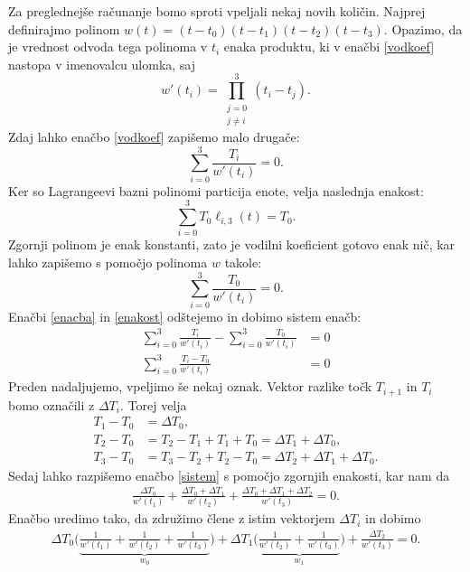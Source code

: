 \documentclass[mat1]{fmfdelo}
\newcommand{\de}{\Delta}
\begin{document}
Za preglednejše računanje bomo sproti vpeljali nekaj novih količin. Najprej definirajmo polinom $w(t) = (t - t_0)(t - t_1)(t - t_2)(t - t_3)$. Opazimo, da je vrednost odvoda tega polinoma v $t_i$ enaka produktu, ki v enačbi \eqref{vodkoef} nastopa v imenovalcu ulomka, saj
%
\begin{equation*}
w'(t_i) = \prod_{\substack{j = 0 \\ j \neq i}}^3(t_i - t_j).
\end{equation*}
%
Zdaj lahko enačbo \eqref{vodkoef} zapišemo malo drugače:
\begin{equation}\label{enacba}
\sum_{i = 0}^{3}  \frac{T_i}{w'(t_i)} = 0.
\end{equation}
%
Ker so Lagrangeevi bazni polinomi particija enote, velja naslednja enakost:
\begin{equation*}
\sum_{i = 0}^{3} T_0 \ell_{i,3}(t)  = T_0.
\end{equation*}
%
Zgornji polinom je enak konstanti, zato je vodilni koeficient gotovo enak nič, kar lahko zapišemo s pomočjo polinoma $w$ takole:
%
\begin{equation}\label{enakost}
\sum_{i = 0}^{3} \frac{T_0}{w'(t_i)} = 0.
\end{equation}
%
Enačbi \eqref{enacba} in \eqref{enakost} odštejemo in dobimo sistem enačb:
%
\begin{align}
\sum_{i = 0}^{3}  \frac{T_i}{w'(t_i)} - \sum_{i = 0}^{3}  \frac{T_0}{w'(t_i)} &= 0 \nonumber \\
\sum_{i = 0}^{3}  \frac{T_i - T_0}{w'(t_i)} &= 0 \label{sistem}
\end{align}
%
Preden nadaljujemo, vpeljimo še nekaj oznak. Vektor razlike točk $T_{i+1}$ in $T_i$ bomo označili z $\de T_i$.\label{delta} Torej velja
%
\begin{align*}
T_1 - T_0 &= \de T_0, \\
T_2 - T_0 &= T_2 - T_1 + T_1 + T_0 = \de T_1 + \de T_0, \\
T_3 - T_0 &= T_3 - T_2 + T_2 - T_0 = \de T_2 +  \de T_1 + \de T_0.
\end{align*}
%
Sedaj lahko razpišemo enačbo \eqref{sistem} s pomočjo zgornjih enakosti, kar nam da
%
\begin{align*}
\frac{\de T_0}{w'(t_1)} + \frac{\de T_0 + \de T_1}{w'(t_2)} + \frac{\de T_0 + \de T_1 + \de T_2}{w'(t_3)} = 0.
\end{align*}
%
Enačbo uredimo tako, da združimo člene z istim vektorjem $\de T_i$ in dobimo
\begin{align}\label{w0w1}
\de T_0 \bigg( \underbrace{\frac{1}{w'(t_1)} + \frac{1}{w'(t_2)} +\frac{1}{w'(t_3)}}_\text{$w_0$} \bigg) + \de T_1 \bigg( \underbrace{ \frac{1}{w'(t_2)} +\frac{1}{w'(t_3)}}_\text{$w_1$} \bigg) +  \frac{\de T_2}{w'(t_3)}= 0.
\end{align}
\end{document}
